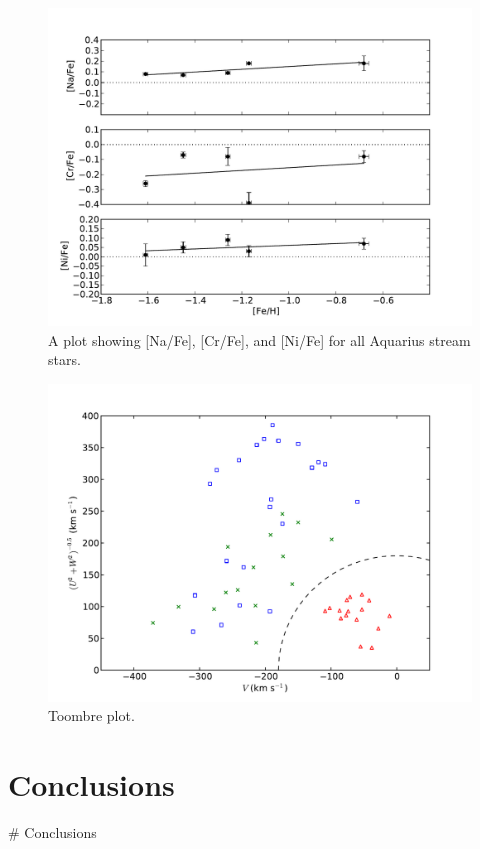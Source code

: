 \documentclass{emulateapj}
\begin{document}
\begin{figure}[h]
	\includegraphics[width=\columnwidth]{./figures/aquarius-na-cr-ni-fe.pdf}
	\caption{A plot showing [Na/Fe], [Cr/Fe], and [Ni/Fe] for all Aquarius stream stars.}
	\label{fig:na-cr-ni-fe}
\end{figure}




\begin{figure}[h]
	\includegraphics[width=\columnwidth]{./figures/plot-toombre.pdf}
	\caption{Toombre plot.}
	\label{fig:toombre}
\end{figure}


\section{Conclusions}
\label{sec:conclusions}
\# Conclusions
\end{document}
